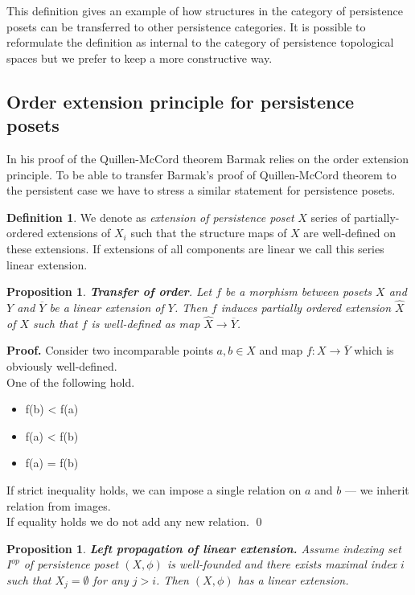 \documentclass[english,12pt]{article}
\newcounter{stmcounter}[section]
\numberwithin{equation}{section}
\newtheorem{proposition}[stmcounter]{Proposition}
\theoremstyle{definition}
\newtheorem{definition}[stmcounter]{Definition}
\theoremstyle{remark}
\newenvironment{pf}{\noindent\textbf{Proof.}}{\qed}
\newcommand{\define}[1]{{\textit{#1}}}
\begin{document}
This definition gives an example of how structures in the category of persistence posets can be transferred to other persistence categories. It is possible to reformulate the definition as internal to the category of persistence topological spaces but we prefer to keep a more constructive way.


\subsection{Order extension principle for persistence posets}

In his proof of the Quillen-McCord theorem Barmak relies on the order extension principle. To be able to transfer Barmak's proof of Quillen-McCord theorem to the persistent case we have to stress a similar statement for persistence posets.

\begin{definition}
  We denote as \define{extension of persistence poset} $X$ series of partially-ordered extensions of $X_i$ such that the structure maps of $X$ are well-defined on these extensions. If extensions of all components are linear we call this series linear extension.
\end{definition}

\begin{proposition}
  \textbf{Transfer of order}. Let $f$ be a morphism between posets $X$ and $Y$ and $\overline{Y}$ be a linear extension of $Y$. Then $f$ induces partially ordered extension $\hat{X}$ of $X$ such that $f$ is well-defined as map $\hat{X} \to \overline{Y}$.
\end{proposition}

\begin{pf}
  Consider two incomparable points $a, b \in X$ and map $f : X \to \overline{Y}$ which is obviously well-defined.\\
  One of the following hold.\\
  \begin{itemize}
    \item f(b) < f(a)
    \item f(a) < f(b)
    \item f(a) = f(b)
  \end{itemize}
  If strict inequality holds, we can impose a single relation on $a$ and $b$ --- we inherit relation from images.\\
  If equality holds we do not add any new relation.
\end{pf}

\begin{proposition}
  \textbf{Left propagation of linear extension.} Assume indexing set $I^{op}$ of persistence poset $(X,\phi)$ is well-founded and there exists maximal index $i$ such that $X_j = \emptyset$ for any $j > i$. Then $(X,\phi)$ has a linear extension.
\end{proposition}
\end{document}
